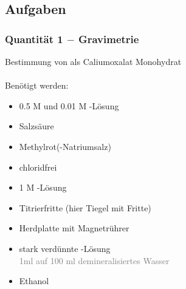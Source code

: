 \documentclass{article}
\begin{document}
\subsection{Aufgaben}


\subsubsection{Quantität 1 $-$ Gravimetrie}

Bestimmung von  als Caliumoxalat Monohydrat \\\\
Benötigt werden:
\begin{itemize}
    \item 0.5 M und 0.01 M -Lösung
    \item Salzsäure 
    \item Methylrot(-Natriumsalz)
    \item {} chloridfrei
    \item 1 M -Lösung
    \item Titrierfritte (hier Tiegel mit Fritte)
    \item Herdplatte mit Magnetrührer
    \item stark verdünnte -Lösung\\\textcolor{gray}{1ml  auf 100 ml demineralisiertes Wasser}
    \item Ethanol
\end{itemize}
\end{document}
